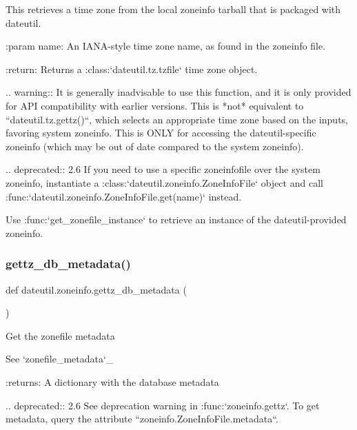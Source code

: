 \begin{DoxyVerb}This retrieves a time zone from the local zoneinfo tarball that is packaged
with dateutil.

:param name:
    An IANA-style time zone name, as found in the zoneinfo file.

:return:
    Returns a :class:`dateutil.tz.tzfile` time zone object.

.. warning::
    It is generally inadvisable to use this function, and it is only
    provided for API compatibility with earlier versions. This is *not*
    equivalent to ``dateutil.tz.gettz()``, which selects an appropriate
    time zone based on the inputs, favoring system zoneinfo. This is ONLY
    for accessing the dateutil-specific zoneinfo (which may be out of
    date compared to the system zoneinfo).

.. deprecated:: 2.6
    If you need to use a specific zoneinfofile over the system zoneinfo,
    instantiate a :class:`dateutil.zoneinfo.ZoneInfoFile` object and call
    :func:`dateutil.zoneinfo.ZoneInfoFile.get(name)` instead.

    Use :func:`get_zonefile_instance` to retrieve an instance of the
    dateutil-provided zoneinfo.
\end{DoxyVerb}
 \mbox{\label{namespacedateutil_1_1zoneinfo_a813fb88c7ca8197be2f9753e04b552ba}} 
\subsubsection{\texorpdfstring{gettz\+\_\+db\+\_\+metadata()}{gettz\_db\_metadata()}}
{\footnotesize\ttfamily def dateutil.\+zoneinfo.\+gettz\+\_\+db\+\_\+metadata (\begin{DoxyParamCaption}{ }\end{DoxyParamCaption})}

\begin{DoxyVerb}Get the zonefile metadata

See `zonefile_metadata`_

:returns:
    A dictionary with the database metadata

.. deprecated:: 2.6
    See deprecation warning in :func:`zoneinfo.gettz`. To get metadata,
    query the attribute ``zoneinfo.ZoneInfoFile.metadata``.
\end{DoxyVerb}
 \mbox{\label{namespacedateutil_1_1zoneinfo_a627f3aa7152a10ca0c6454808b86dce7}} 
